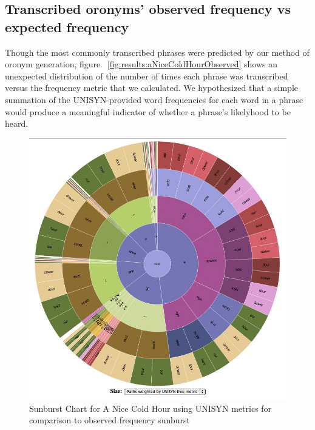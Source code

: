 


\subsection{Transcribed oronyms' observed frequency vs expected frequency}
\label{results:transcriptionExpectedVsObservedFreq}

Though the most commonly transcribed phrases were predicted by our method of oronym generation, figure ~\ref{fig:results:aNiceColdHourObserved} shows an unexpected distribution of the number of times each phrase was transcribed versus the frequency metric that we calculated. We hypothesized that a simple summation of the UNISYN-provided word frequencies for each word in a phrase would produce a meaningful indicator of whether a phrase's likelyhood to be heard.  

\begin{figure}
\includegraphics[width=150mm]{aNiceColdHour_UNISYN_FreqMetric_withUnpredictedSliver.jpg}
\captionfonts
\caption[Sunburst Chart for A Nice Cold Hour using UNISYN metrics for comparison to observed frequency sunburst]{Sunburst Chart for A Nice Cold Hour using UNISYN metrics for comparison to observed frequency sunburst}
\label{fig:results:aNiceColdHourUNISYNwithUnpredicted}
\end{figure}

